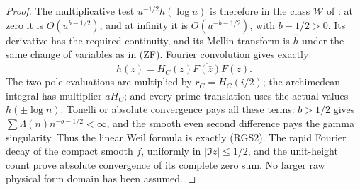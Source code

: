 \documentclass[11pt]{article}
\theoremstyle{remark}\newtheorem{remark}[theorem]{Remark}
\begin{document}
\begin{proof}
The multiplicative test $u^{-1/2}h(\log u)$ is therefore in the
class $\mathcal W$ of \cite[Section 2.1.1, eqs.~(2.1)--(2.7),
pp.~101--102]{ConnesConsani}: at zero it is
$O(u^{b-1/2})$, and at infinity it is
$O(u^{-b-1/2})$, with $b-1/2>0$.
Its derivative has the required continuity, and its Mellin
transform is $\widehat h$ under the same change of variables as
in (ZF). Fourier convolution gives exactly
\[
 \widehat h(z)=H_C(z)\overline{F(\bar z)}F(z).
\]
The two pole evaluations are multiplied by $r_C=H_C(i/2)$;
the archimedean integral has multiplier $aH_C$; and every
prime translation uses the actual values $h(\pm\log n)$.
Tonelli or absolute convergence pays all these terms:
$b>1/2$ gives $\sum\Lambda(n)n^{-b-1/2}<\infty$,
and the smooth even second difference pays the gamma singularity.
Thus the linear Weil formula is exactly (RGS2).
The rapid Fourier decay of the compact smooth $f$, uniformly
in $|\Im z|\le1/2$, and the unit-height count prove absolute
convergence of its complete zero sum. No larger raw physical
form domain has been assumed.
\end{proof}
\end{document}
